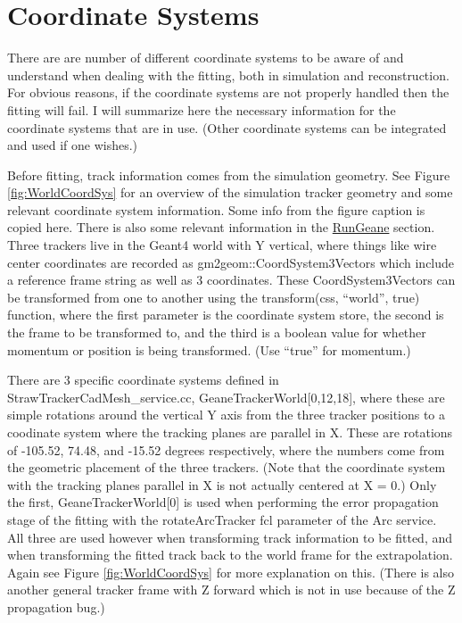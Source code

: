 \section{Coordinate Systems}
\label{sec:Coord}

	There are are number of different coordinate systems to be aware of and understand when dealing with the fitting, both in simulation and reconstruction. For obvious reasons, if the coordinate systems are not properly handled then the fitting will fail. I will summarize here the necessary information for the coordinate systems that are in use. (Other coordinate systems can be integrated and used if one wishes.)

	Before fitting, track information comes from the simulation geometry. See Figure \ref{fig:WorldCoordSys} for an overview of the simulation tracker geometry and some relevant coordinate system information. Some info from the figure caption is copied here. There is also some relevant information in the \hyperref[sec:RunGeane]{RunGeane} section. Three trackers live in the Geant4 world with Y vertical, where things like wire center coordinates are recorded as gm2geom::CoordSystem3Vectors which include a reference frame string as well as 3 coordinates. These CoordSystem3Vectors can be transformed from one to another using the transform(css, ``world'', true) function, where the first parameter is the coordinate system store, the second is the frame to be transformed to, and the third is a boolean value for whether momentum or position is being transformed. (Use ``true'' for momentum.)

	There are 3 specific coordinate systems defined in StrawTrackerCadMesh\_service.cc, GeaneTrackerWorld[0,12,18], where these are simple rotations around the vertical Y axis from the three tracker positions to a coodinate system where the tracking planes are parallel in X. These are rotations of -105.52, 74.48, and -15.52 degrees respectively, where the numbers come from the geometric placement of the three trackers. (Note that the coordinate system with the tracking planes parallel in X is not actually centered at X = 0.) Only the first, GeaneTrackerWorld[0] is used when performing the error propagation stage of the fitting with the rotateArcTracker fcl parameter of the Arc service. All three are used however when transforming track information to be fitted, and when transforming the fitted track back to the world frame for the extrapolation. Again see Figure \ref{fig:WorldCoordSys} for more explanation on this. (There is also another general tracker frame with Z forward which is not in use because of the Z propagation bug.) 

